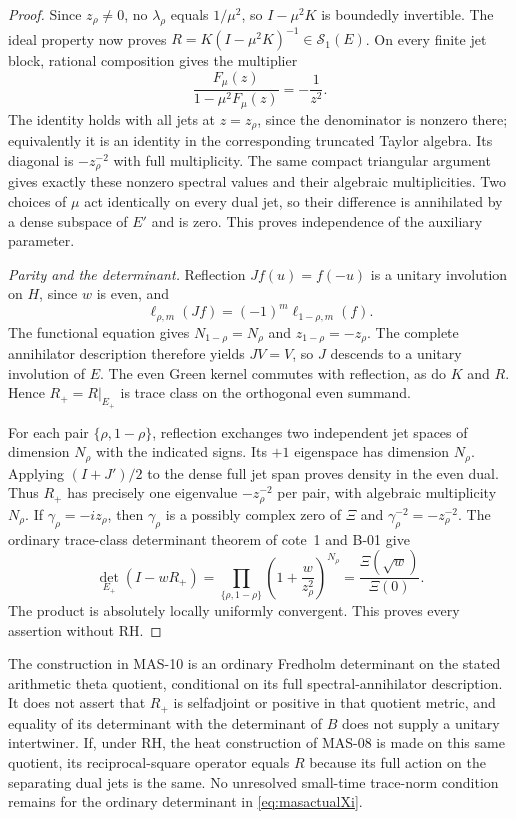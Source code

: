 \documentclass[11pt,a4paper]{article}
\newcommand{\Sone}{\mathcal S_1}
\newcommand{\fid}[1]{\textsf{#1}}
\begin{document}
\begin{proof}
Since $z_\rho\ne0$, no $\lambda_\rho$ equals $1/\mu^2$, so $I-\mu^2K$ is boundedly invertible. The ideal property now proves
$R=K(I-\mu^2K)^{-1}\in\Sone(E)$. On every finite jet block, rational composition gives the multiplier
\[
 \frac{F_\mu(z)}{1-\mu^2F_\mu(z)}=-\frac1{z^2}.
\]
The identity holds with all jets at $z=z_\rho$, since the denominator is nonzero there; equivalently it is an identity in the corresponding truncated Taylor algebra. Its diagonal is $-z_\rho^{-2}$ with full multiplicity. The same compact triangular argument gives exactly these nonzero spectral values and their algebraic multiplicities. Two choices of $\mu$ act identically on every dual jet, so their difference is annihilated by a dense subspace of $E'$ and is zero. This proves independence of the auxiliary parameter.

\emph{Parity and the determinant.}
Reflection $Jf(u)=f(-u)$ is a unitary involution on $H$, since $w$ is even, and
\[
 \ell_{\rho,m}(Jf)=(-1)^m\ell_{1-\rho,m}(f).
\]
The functional equation gives $N_{1-\rho}=N_\rho$ and $z_{1-\rho}=-z_\rho$. The complete annihilator description therefore yields $JV=V$, so $J$ descends to a unitary involution of $E$. The even Green kernel commutes with reflection, as do $K$ and $R$. Hence $R_+=R|_{E_+}$ is trace class on the orthogonal even summand.

For each pair $\{\rho,1-\rho\}$, reflection exchanges two independent jet spaces of dimension $N_\rho$ with the indicated signs. Its $+1$ eigenspace has dimension $N_\rho$. Applying $(I+J')/2$ to the dense full jet span proves density in the even dual. Thus $R_+$ has precisely one eigenvalue $-z_\rho^{-2}$ per pair, with algebraic multiplicity $N_\rho$. If $\gamma_\rho=-iz_\rho$, then $\gamma_\rho$ is a possibly complex zero of $\Xi$ and $\gamma_\rho^{-2}=-z_\rho^{-2}$. The ordinary trace-class determinant theorem of cote~1 and \fid{B-01} give
\[
 \det_{E_+}(I-wR_+)
 =\prod_{\{\rho,1-\rho\}}
 \left(1+\frac{w}{z_\rho^2}\right)^{N_\rho}
 =\frac{\Xi(\sqrt w)}{\Xi(0)}.
\]
The product is absolutely locally uniformly convergent. This proves every assertion without RH.
\end{proof}

The construction in \fid{MAS-10} is an ordinary Fredholm determinant on the stated arithmetic theta quotient, conditional on its full spectral-annihilator description. It does not assert that $R_+$ is selfadjoint or positive in that quotient metric, and equality of its determinant with the determinant of $B$ does not supply a unitary intertwiner. If, under RH, the heat construction of \fid{MAS-08} is made on this same quotient, its reciprocal-square operator equals $R$ because its full action on the separating dual jets is the same. No unresolved small-time trace-norm condition remains for the ordinary determinant in \eqref{eq:masactualXi}.
\end{document}
